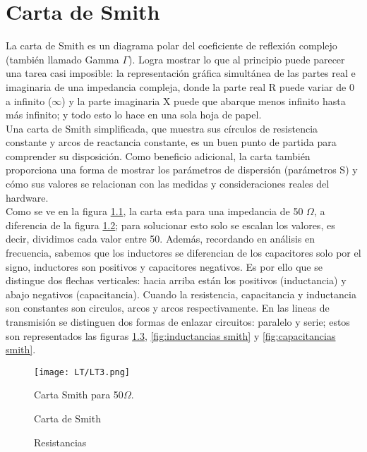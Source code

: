 \documentclass[
	12pt, %
	fleqn, %
	a4paper, %
]{LegrandOrangeBook}
\begin{document}
\chapter{Carta de Smith}
La carta de Smith es un diagrama polar del coeficiente de reflexión complejo (también llamado Gamma $\Gamma$). Logra mostrar lo que al principio puede parecer una tarea casi imposible: la representación gráfica simultánea de las partes real e imaginaria de una impedancia compleja, donde la parte real R puede variar de 0 a infinito ($\infty$) y la parte imaginaria X puede que abarque menos infinito hasta más infinito; y todo esto lo hace en una sola hoja de papel.\\
Una carta de Smith simplificada, que muestra sus círculos de resistencia constante y arcos de reactancia constante, es un buen punto de partida para comprender su disposición. Como beneficio adicional, la carta también proporciona una forma de mostrar los parámetros de dispersión (parámetros S) y cómo sus valores se relacionan con las medidas y consideraciones reales del hardware.\\
Como se ve en la figura \ref{fig:partes smith}, la carta esta para una impedancia de 50 $\Omega$, a diferencia de la figura \ref{fig:smith chart}; para solucionar esto solo se escalan los valores, es decir, dividimos cada valor entre 50. Además, recordando en análisis en frecuencia, sabemos que los inductores se diferencian de los capacitores solo por el signo, inductores son positivos y capacitores negativos. Es por ello que se distingue dos flechas verticales: hacia arriba están los positivos (inductancia) y abajo negativos (capacitancia). Cuando la resistencia, capacitancia y inductancia son constantes son circulos, arcos y arcos respectivamente. En las lineas de transmisión se distinguen dos formas de enlazar circuitos: paralelo y serie; estos son representados las figuras \ref{fig:resistencias smith}, \ref{fig:inductancias smith} y \ref{fig:capacitancias smith}.
\begin{figure}[]
\centering
\texttt{[image: LT/LT3.png]}
\caption{Carta Smith para 50$\Omega$.}
\label{fig:partes smith}
\end{figure}
\begin{figure}[]
\centering
{}
\caption{Carta de Smith}
\label{fig:smith chart}
\end{figure}
\begin{figure}[]
\centering
{}
\caption{Resistancias}
\label{fig:resistencias smith}
\end{figure}
\end{document}
